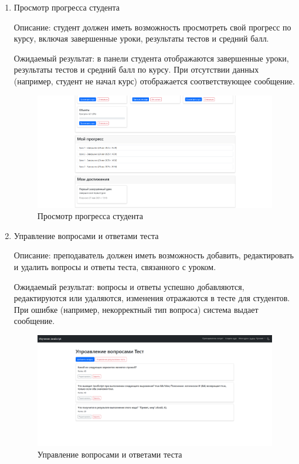 \begin{enumerate}
	\item Просмотр прогресса студента
	
Описание: студент должен иметь возможность просмотреть свой прогресс по курсу, включая завершенные уроки, результаты тестов и средний балл.
	
Ожидаемый результат: в панели студента отображаются завершенные уроки, результаты тестов и средний балл по курсу. При отсутствии данных (например, студент не начал курс) отображается соответствующее сообщение.
	
	\begin{figure}[ht]
		\centering
		\includegraphics[width=1\textwidth]{images/прогресс} 
		\caption{Просмотр прогресса студента}
		\label{progress:image}
	\end{figure}
\newpage	
	\item Управление вопросами и ответами теста
	
Описание: преподаватель должен иметь возможность добавить, редактировать и удалить вопросы и ответы теста, связанного с уроком.
	
Ожидаемый результат: вопросы и ответы успешно добавляются, редактируются или удаляются, изменения отражаются в тесте для студентов. При ошибке (например, некорректный тип вопроса) система выдает сообщение.
	
	\begin{figure}[ht]
		\centering
		\includegraphics[width=1\textwidth]{images/вопросы} 
		\caption{Управление вопросами и ответами теста}
		\label{questions:image}
	\end{figure}
	
\end{enumerate}

